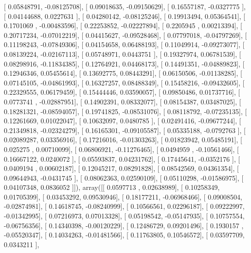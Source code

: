 \documentclass{article}
\begin{document}
       [ 0.05848791, -0.08125708],
       [ 0.09018635, -0.09150629],
       [ 0.16557187, -0.0327775 ],
       [ 0.04144688,  0.0227631 ],
       [ 0.04280142, -0.08125246],
       [ 0.19913494,  0.05364541],
       [ 0.1701069 , -0.00483596],
       [ 0.22253852, -0.02227894],
       [ 0.2205945 ,  0.00213394],
       [ 0.20717234, -0.07012219],
       [ 0.04415627, -0.09528468],
       [ 0.07797018, -0.04797269],
       [ 0.11198243, -0.07849306],
       [ 0.04154658,  0.06488193],
       [ 0.11049914, -0.09273077],
       [ 0.08139224, -0.02167113],
       [ 0.05748971,  0.0443751 ],
       [ 0.19327974,  0.06781539],
       [ 0.08298916, -0.11834385],
       [ 0.12764921,  0.04468173],
       [ 0.14491351, -0.04889823],
       [ 0.12946346,  0.05455614],
       [ 0.13692775,  0.08443291],
       [ 0.06150506, -0.01138285],
       [ 0.07145105, -0.04861993],
       [ 0.16327257,  0.08488349],
       [ 0.15458216, -0.09432605],
       [ 0.22329555,  0.06179459],
       [ 0.15444446,  0.03590057],
       [ 0.09850486,  0.01737716],
       [ 0.0773741 , -0.02887951],
       [ 0.14902391,  0.08332077],
       [ 0.08154387,  0.03487025],
       [ 0.18281321, -0.08594057],
       [ 0.19741825, -0.08531076],
       [ 0.08118792, -0.07235135],
       [ 0.12261669,  0.01022047],
       [ 0.10632097,  0.0480785 ],
       [ 0.02491416, -0.09677244],
       [ 0.21349818, -0.02324279],
       [ 0.16165301, -0.09105587],
       [ 0.05335188, -0.0792763 ],
       [ 0.02089287,  0.03356916],
       [ 0.17216016, -0.01303263],
       [ 0.01823942,  0.05485191],
       [ 0.025275  ,  0.00710099],
       [ 0.06806921, -0.11276465],
       [ 0.0494959 , -0.10561466],
       [ 0.16667122,  0.0240072 ],
       [ 0.05593837,  0.04231762],
       [ 0.17445641, -0.0352176 ],
       [ 0.0409194 ,  0.00602187],
       [ 0.12045217,  0.08291828],
       [ 0.08542569,  0.04361354],
       [ 0.09644943, -0.0431745 ],
       [ 0.08062363,  0.02590109],
       [ 0.05110298, -0.01586975],
       [ 0.04107348,  0.0836052 ]]), array([[ 0.0597713 ,  0.02638989],
       [ 0.10258349,  0.01705399],
       [ 0.03453292,  0.09530946],
       [ 0.18177211, -0.06968466],
       [ 0.09008504, -0.02874981],
       [ 0.14618745, -0.08240999],
       [ 0.10566561,  0.02296187],
       [ 0.09222997, -0.01342995],
       [ 0.07216973,  0.07013328],
       [ 0.05198542, -0.05147935],
       [ 0.10757554, -0.06756356],
       [ 0.14340398, -0.00120229],
       [ 0.12486729,  0.09201496],
       [ 0.1930157 , -0.05520347],
       [ 0.14034263, -0.01481566],
       [ 0.11763805,  0.10546572],
       [ 0.03597709,  0.0343211 ],
\end{document}
